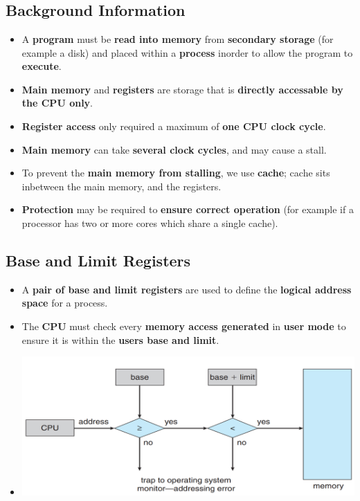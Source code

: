 \documentclass{article}
\begin{document}
    \section*{}

    \subsection*{Background Information}
    \begin{itemize}
        \item A \textbf{program} must be \textbf{read into memory} from \textbf{secondary storage} (for example a disk) and placed within a \textbf{process} inorder to allow the program to \textbf{execute}.
        \item \textbf{Main memory} and \textbf{registers} are storage that is \textbf{directly accessable by the CPU only}.
        \item \textbf{Register access} only required a maximum of \textbf{one CPU clock cycle}.
        \item \textbf{Main memory} can take \textbf{several clock cycles}, and may cause a stall.
        \item To prevent the \textbf{main memory from stalling}, we use \textbf{cache}; cache sits inbetween the main memory, and the registers.
        \item \textbf{Protection} may be required to \textbf{ensure correct operation} (for example if a processor has two or more cores which share a single cache).
    \end{itemize}

    \subsection*{Base and Limit Registers}
    \begin{itemize}
        \item A \textbf{pair of base and limit registers} are used to define the \textbf{logical address space} for a process.
        \item The \textbf{CPU} must check every \textbf{memory access generated} in \textbf{user mode} to ensure it is within the \textbf{users base and limit}.
        \item[] \includegraphics*[width=\textwidth - 25pt]{images/Base-Limit.PNG}
    \end{itemize}
\end{document}
